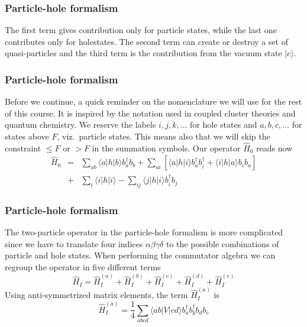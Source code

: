 \documentclass[compress]{beamer}
\newcommand*{\ket}[1]{|#1\rangle}
\newcommand*{\bra}[1]{\langle#1|}
\newcommand{\element}[3]
        {\bra{#1}#2\ket{#3}}
\begin{document}
\frame
{
  \frametitle{Particle-hole formalism}
\begin{small}
{\scriptsize
The first term  gives contribution only for particle states, while the last one
contributes only for holestates. The second term can create or destroy a set of
quasi-particles and 
the third term is the contribution  from the vacuum state $\ket{c}$.
}
\end{small}
}
\frame
{
  \frametitle{Particle-hole formalism}
\begin{small}
{\scriptsize
Before we continue, a quick reminder on the  nomenclature we will use for the rest of this
course. It is inspired by the notation used in coupled cluster theories and quantum chemistry.
We reserve the labels $i,j,k,\dots$ for hole states and $a,b,c,\dots$ for states above $F$, viz.~particle states.
This means also that we will skip the constraint $\leq F$ or $> F$ in the summation symbols. 
Our operator $\hat{H}_0$  reads now 
\begin{eqnarray}
	\hat{H}_0 &=& \sum_{ab} \element{a}{h}{b}  b_a^\dagger b_b +
		\sum_{ai} \left[
		\element{a}{h}{i} b_a^\dagger b_i^\dagger + 
		\element{i}{h}{a} b_i  b_a \right] \nonumber \\
	&+& \sum_{i} \element{i}{h}{i} - 
		\sum_{ij} \element{j}{h}{i}
		b_i^\dagger b_j \label{eq:2-63b}
\end{eqnarray} 
}
\end{small}
}
\frame
{
  \frametitle{Particle-hole formalism}
\begin{small}
{\scriptsize
The two-particle operator in the particle-hole formalism  is more complicated since we have
to translate four indices $\alpha\beta\gamma\delta$ to the possible combinations of particle and hole
states.  When performing the commutator algebra we can regroup the operator in five different terms
\begin{equation}
	\hat{H}_I = \hat{H}_I^{(a)} + \hat{H}_I^{(b)} + \hat{H}_I^{(c)} + \hat{H}_I^{(d)} + \hat{H}_I^{(e)} \label{eq:2-65}
\end{equation}
Using anti-symmetrized  matrix elements, 
the term  $\hat{H}_I^{(a)}$ is  
\begin{equation}
	\hat{H}_I^{(a)} = \frac{1}{4}
	\sum_{abcd} \element{ab}{V}{cd} 
		b_a^\dagger b_b^\dagger b_d b_c \label{eq:2-66}
\end{equation}
}
\end{small}
}
\frame
\end{document}
